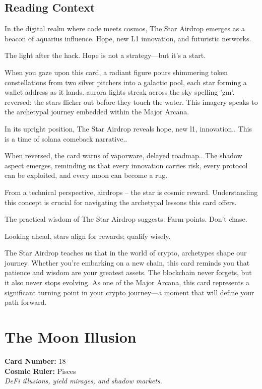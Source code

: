 \documentclass[11pt,oneside]{book}
\begin{document}
\begin{minipage}[t]{0.55\textwidth}
  \subsection*{Reading Context}
  In the digital realm where code meets cosmos, The Star Airdrop emerges as a beacon of aquarius influence. Hope, new L1 innovation, and futuristic networks.

  The light after the hack. Hope is not a strategy—but it's a start.

  When you gaze upon this card, a radiant figure pours shimmering token constellations from two silver pitchers into a galactic pool, each star forming a wallet address as it lands. aurora lights streak across the sky spelling 'gm'. reversed: the stars flicker out before they touch the water. This imagery speaks to the archetypal journey embedded within the Major Arcana.

  In its upright position, The Star Airdrop reveals hope, new l1, innovation.. This is a time of solana comeback narrative..

  When reversed, the card warns of vaporware, delayed roadmap.. The shadow aspect emerges, reminding us that every innovation carries risk, every protocol can be exploited, and every moon can become a rug.

  From a technical perspective, airdrops – the star is cosmic reward. Understanding this concept is crucial for navigating the archetypal lessons this card offers.

  The practical wisdom of The Star Airdrop suggests: Farm points. Don't chase.

  Looking ahead, stars align for rewards; qualify wisely.

  The Star Airdrop teaches us that in the world of crypto, archetypes shape our journey. Whether you're embarking on a new chain, this card reminds you that patience and wisdom are your greatest assets. The blockchain never forgets, but it also never stops evolving. As one of the Major Arcana, this card represents a significant turning point in your crypto journey—a moment that will define your path forward.

\end{minipage}

\newpage
\section*{The Moon Illusion}

\begin{minipage}[t]{0.55\textwidth}
  \vspace{0pt}
  \textbf{Card Number:} 18\\  \textbf{Cosmic Ruler:} Pisces\\  \textit{DeFi illusions, yield mirages, and shadow markets.}
\end{minipage}
\end{document}
